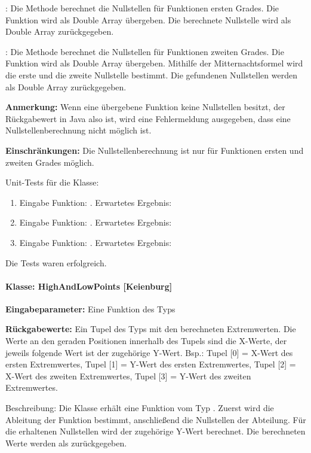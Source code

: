: Die Methode berechnet die Nullstellen für Funktionen ersten Grades. Die Funktion wird als Double Array übergeben. Die berechnete Nullstelle wird als Double Array zurückgegeben. 

: Die Methode berechnet die Nullstellen für Funktionen zweiten Grades. Die Funktion wird als Double Array übergeben. Mithilfe der Mitternachtsformel wird die erste und die zweite Nullstelle bestimmt. Die gefundenen Nullstellen werden als Double Array zurückgegeben. 

\textbf{Anmerkung:} Wenn eine übergebene Funktion keine Nullstellen besitzt, der Rückgabewert in Java also  ist, wird eine Fehlermeldung ausgegeben, dass eine Nullstellenberechnung nicht möglich ist. 

\textbf{Einschränkungen:} Die Nullstellenberechnung ist nur für Funktionen ersten und zweiten Grades möglich. 

Unit-Tests für die Klasse: 

\begin{enumerate}
	\item Eingabe Funktion: . Erwartetes Ergebnis: 
	\item Eingabe Funktion: . Erwartetes Ergebnis: 
	\item Eingabe Funktion: . Erwartetes Ergebnis: 
\end{enumerate}

Die Tests waren erfolgreich.

\paragraph{Klasse: HighAndLowPoints [Keienburg]}

\textbf{Eingabeparameter:} Eine Funktion des Typs 

\textbf{Rückgabewerte: }Ein Tupel des Typs  mit den berechneten Extremwerten. Die Werte an den geraden Positionen innerhalb des Tupels sind die X-Werte, der jeweils folgende Wert ist der zugehörige Y-Wert. Bsp.: Tupel [0] = X-Wert des ersten Extremwertes, Tupel [1] = Y-Wert des ersten Extremwertes, Tupel [2] = X-Wert des zweiten Extremwertes, Tupel [3] = Y-Wert des zweiten Extremwertes. 

Beschreibung: Die Klasse erhält eine Funktion vom Typ . Zuerst wird die Ableitung der Funktion bestimmt, anschließend die Nullstellen der Abteilung. Für die erhaltenen Nullstellen wird der zugehörige Y-Wert berechnet. Die berechneten Werte werden als  zurückgegeben. 


